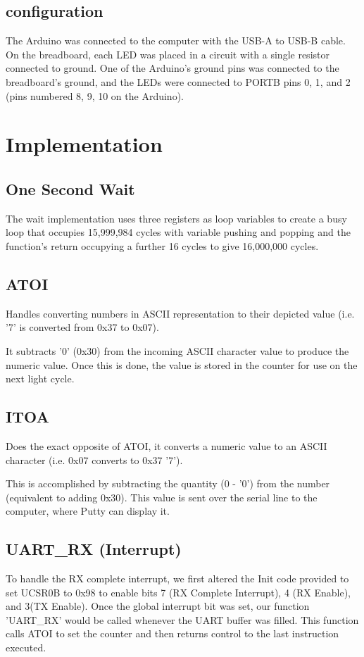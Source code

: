 \documentclass[letterpaper,11pt]{texMemo} %
\begin{document}
\subsection*{configuration}
The Arduino was connected to the computer with the USB-A to USB-B cable. On the breadboard, each LED was placed in a circuit with a single resistor connected to ground. One of the Arduino's ground pins was connected to the breadboard's ground, and the LEDs were connected to PORTB pins 0, 1, and 2 (pins numbered 8, 9, 10 on the Arduino).

\section*{Implementation}
\subsection*{One Second Wait}
The wait implementation uses three registers as loop variables to create a busy loop that occupies 15,999,984 cycles with variable pushing and popping and the function's return occupying a further 16 cycles to give 16,000,000 cycles.

\subsection*{ATOI}
Handles converting numbers in ASCII representation to their depicted value (i.e. '7' is converted from 0x37 to 0x07).

It subtracts '0' (0x30) from the incoming ASCII character value to produce the numeric value. Once this is done, the value is stored in the counter for use on the next light cycle.

\subsection*{ITOA}
Does the exact opposite of ATOI, it converts a numeric value to an ASCII character (i.e. 0x07 converts to 0x37 '7').

This is accomplished by subtracting the quantity (0 - '0') from the number (equivalent to adding 0x30). This value is sent over the serial line to the computer, where Putty can display it.

\subsection*{UART\_RX (Interrupt)}
To handle the RX complete interrupt, we first altered the Init code provided to set UCSR0B to 0x98 to enable bits 7 (RX Complete Interrupt), 4 (RX Enable), and 3(TX Enable). Once the global interrupt bit was set, our function 'UART\_RX' would be called whenever the UART buffer was filled. This function calls ATOI to set the counter and then returns control to the last instruction executed.
\end{document}
